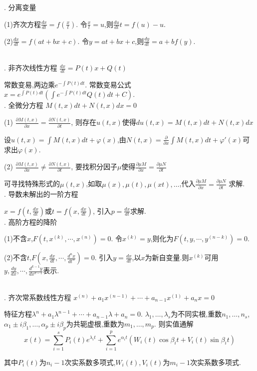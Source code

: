 \documentclass[UTF8]{ctexart}
\begin{document}
. 分离变量 \par
(1)齐次方程$\frac{dx}{dt}=f(\frac{x}{t})$. 令$\frac{x}{t}=u$,则$\frac{du}{dt}t=f(u)-u$.\par
(2)$\frac{dx}{dt}=f(at+bx+c)$. 令$y=at+bx+c$,则$\frac{dy}{dt}=a+bf(y)$.\par
~\\

. 非齐次线性方程 $\frac{dx}{dt}=P(t)x+Q(t)$\par
常数变易,两边乘$e^{-\int P(t)dt}$. 常数变易公式$x=e^{\int P(t)dt}(\int e^{-\int P(t)dt}Q(t)dt+C)$.
~\\


. 全微分方程 $M(t,x)dt+N(t,x)dx=0$ \par
(1) $\frac{\partial M(t,x)}{\partial x}=\frac{\partial N(t,x)}{\partial t}$, 则存在$u(t,x)$使得$du(t,x)=M(t,x)dt+N(t,x)dx$\par
设$u(t,x)=\int M(t,x)dt+\varphi(x)$,由$N(t,x)=\frac{\partial }{\partial x}\int M(t,x)dt+\varphi'(x)$可求出$\varphi(x)$. \par
(2) $\frac{\partial M(t,x)}{\partial x} \neq \frac{\partial N(t,x)}{\partial t}$,
要找积分因子$\mu$使得$\frac{\partial \mu M}{\partial x}=\frac{\partial \mu N}{\partial t}$ \par
可寻找特殊形式的$\mu(t,x) $,如取$\mu (x),\mu (t),\mu (xt),\dots $,代入$\frac{\partial \mu M}{\partial x}=\frac{\partial \mu N}{\partial t}$ 求解.
~\\


. 导数未解出的一阶方程 \par
$x=f(t,\frac{dx}{dt})$或$t=f(x,\frac{dx}{dt})$,
引入$p=\frac{dx}{dt}$求解.
~\\


. 高阶方程的降阶 \par
(1)不含$x$,$F\left(t, x^{(k)}, \cdots, x^{(n)}\right)=0$.
令$x^{(k)}=y$,则化为$F\left(t, y, \cdots, y^{(n-k)}\right)=0 $.\par
(2)不含$t$,$F\left(x, \frac{d x}{d t}, \cdots, \frac{d^{n} x}{d t^{n}}\right)=0$.
引入$y=\frac{dx}{dt}$,以$x$为新自变量.则$x^{(k)}$可用$y,\frac{dy}{dx},\cdots,\frac{d^{k-1}y}{dx^{k-1}}$表示.\par
~\\

. 齐次常系数线性方程
$x^{(n)}+a_1x^{(n-1)}+\cdots +a_{n-1}x^{(1)}+a_nx=0$ \par
特征方程$\lambda ^{n}+a_1\lambda^{n-1}+\cdots +a_{n-1}\lambda+a_n=0$.
$\lambda_1,\dots ,\lambda_s$为不同实根,重数$n_1,\dots ,n_s$,
$\alpha_1 \pm i\beta_1,\dots ,\alpha_p \pm i\beta_p$为共轭虚根,重数为$m_1,\dots ,m_p$.
则实值通解$$x(t)=\sum_{i=1}^s P_i(t)e^{\lambda_i t} + \sum_{i=1}^p e^{\alpha_i t}(W_i(t)\cos \beta_i t +V_i(t) \sin\beta_i t)$$ \par
其中$P_i(t)$为$n_i-1$次实系数多项式,$W_i(t),V_i(t)$为$m_i-1$次实系数多项式.
~\\
\end{document}

